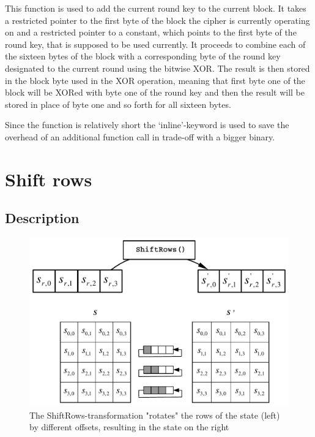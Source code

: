 This function is used to add the current round key to the current block.
It takes a restricted pointer to the first byte of the block the cipher
is currently operating on and a restricted pointer to a constant, which
points to the first byte of the round key, that is supposed to be used
currently. It proceeds to combine each of the sixteen bytes of the block
with a corresponding byte of the round key designated to the current
round using the bitwise XOR. The result is then stored in the block byte
used in the XOR operation, meaning that first byte one of the block will
be XORed with byte one of the round key and then the result will be
stored in place of byte one and so forth for all sixteen bytes.

Since the function is relatively short the `inline'-keyword is used to
save the overhead of an additional function call in trade-off with a
bigger binary.

\hypertarget{shift-rows}{%
\section{Shift rows}\label{shift-rows}}

\hypertarget{description-3}{%
\subsection{Description}\label{description-3}}

\begin{figure}
\centering
\includegraphics[scale = 0.3]{data/figures/shiftrows.png}
\caption{The ShiftRows-transformation "rotates" the rows of the state (left) by different offsets, resulting in the state on the right}
\end{figure}

